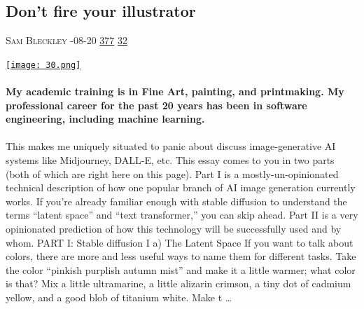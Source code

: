 \documentclass[10pt,a4paper]{article}
\begin{document}
\begin{multicols}{2}
\raggedcolumns
\noindent\begin{minipage}{\linewidth}
\medskip
\subsection{Don't fire your illustrator}
\textsc{\footnotesize
{\scriptsize\faUser}\space 
Sam Bleckley 
{\scriptsize\faCalendar}-08-20 
{\scriptsize\faThumbsOUp}\space 
\href{http://news.ycombinator.com/item?id=37210953\&utm\_term=comment}{377} 
{\scriptsize\faComments}\space 
\href{http://news.ycombinator.com/item?id=37210953\&utm\_term=comment}{32} 
}
\par\medskip\noindent
\href{https://sambleckley.com/writing/dont-fire-your-illustrator.html?utm\_source=hackernewsletter\&utm\_medium=email\&utm\_term=design}{
    \texttt{[image: 30.png]}
}
\end{minipage}
\paragraph{}
\textbf{My academic training is in Fine Art, painting, and printmaking. My professional career for the past 20 years has been in software engineering, including machine learning.}
\paragraph{}
 This makes me uniquely situated to
panic about discuss image-generative AI systems like Midjourney, DALL-E, etc.
This essay comes to you in two parts (both of which are right here on this page).
Part I is a mostly-un-opinionated technical description of how one popular branch of AI image generation currently works. If you’re already familiar enough with stable diffusion to understand the terms “latent space” and “text transformer,” you can skip ahead.
Part II is a very opinionated prediction of how this technology will be successfully used and by whom.
PART I: Stable diffusion
I a) The Latent Space
If you want to talk about colors, there are more and less useful ways to name them for different tasks. Take the color “pinkish purplish autumn mist” and make it a little warmer; what color is that? Mix a little ultramarine, a little alizarin crimson, a tiny dot of cadmium yellow, and a good blob of titanium white. Make t
\dots\par
\noindent\begin{minipage}{\linewidth}
\medskip

\end{minipage}
\end{multicols}
\end{document}
